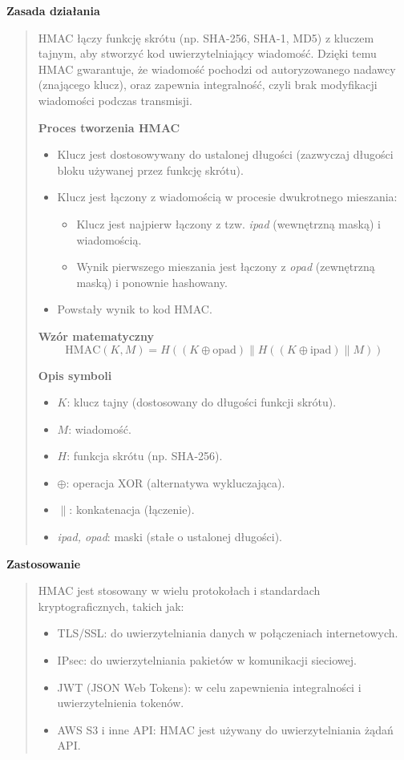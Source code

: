 \documentclass[12pt,a4paper]{article}
\begin{document}
\noindent\textbf{Zasada działania}
\begin{quotation}\noindent HMAC łączy funkcję skrótu (np. SHA-256, SHA-1, MD5) z kluczem tajnym, aby stworzyć kod uwierzytelniający wiadomość. Dzięki temu HMAC gwarantuje, że wiadomość pochodzi od autoryzowanego nadawcy (znającego klucz), oraz zapewnia integralność, czyli brak modyfikacji wiadomości podczas transmisji.\newline

\noindent\textbf{Proces tworzenia HMAC}

\begin{itemize}
     \item Klucz jest dostosowywany do ustalonej długości (zazwyczaj długości bloku używanej przez funkcję skrótu).
    \item Klucz jest łączony z wiadomością w procesie dwukrotnego mieszania:
    \begin{itemize}
        \item Klucz jest najpierw łączony z tzw. \textit{ipad} (wewnętrzną maską) i wiadomością.
        \item Wynik pierwszego mieszania jest łączony z \textit{opad} (zewnętrzną maską) i ponownie hashowany.
    \end{itemize}
    \item Powstały wynik to kod HMAC.
\end{itemize}

\textbf{Wzór matematyczny}
\[
\text{HMAC}(K, M) = H\left((K \oplus \text{opad}) \parallel H((K \oplus \text{ipad}) \parallel M)\right)
\]

\textbf{Opis symboli}
\begin{itemize}
    \item \(K\): klucz tajny (dostosowany do długości funkcji skrótu).
    \item \(M\): wiadomość.
    \item \(H\): funkcja skrótu (np. SHA-256).
    \item \(\oplus\): operacja XOR (alternatywa wykluczająca).
    \item \(\parallel\): konkatenacja (łączenie).
    \item \textit{ipad, opad}: maski (stałe o ustalonej długości).
\end{itemize}
\end{quotation}

\noindent\textbf{Zastosowanie}
\begin{quotation}\noindent  HMAC jest stosowany w wielu protokołach i standardach kryptograficznych, takich jak:
\begin{itemize}
\item TLS/SSL: do uwierzytelniania danych w połączeniach internetowych.
\item IPsec: do uwierzytelniania pakietów w komunikacji sieciowej.
\item JWT (JSON Web Tokens): w celu zapewnienia integralności i uwierzytelnienia tokenów.
\item AWS S3 i inne API: HMAC jest używany do uwierzytelniania żądań API.
\end{itemize}
\end{quotation}
\end{document}
